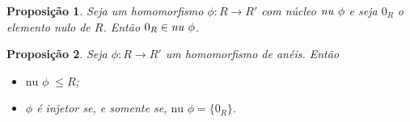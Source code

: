 \documentclass[a4paper,12pt]{article}
\theoremstyle{plain}
\newtheorem{proposicao}{Proposição}[section]
\theoremstyle{definition}
\begin{document}
	\begin{proposicao}
		Seja um homomorfismo $\phi:R\longrightarrow R'$ com núcleo $\text{\emph{nu} }\phi$ e seja $0_R$ o elemento nulo de $R$. Então $0_R \in \text{\emph{nu} }\phi$.
	\end{proposicao}
	
	\begin{proposicao}
		Seja $\phi: R \longrightarrow R'$ um homomorfismo de anéis. Então 
		\begin{itemize}
			\item $\text{nu } \phi\; \leq R$;
			\item $\phi$ é injetor se, e somente se, $\text{nu }\phi = \{0_R\}$.
		\end{itemize}
	\end{proposicao}
	
	
	
	
	
	
	
\end{document}
